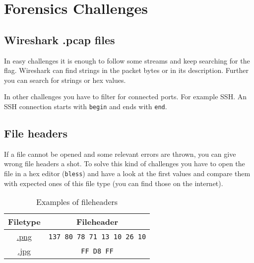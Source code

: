 
\section{Forensics Challenges}

\subsection{Wireshark .pcap files}
In easy challenges it is enough to follow some streams and keep searching for the flag. Wireshark can find strings in the packet bytes or in its description. Further you can search for strings or hex values.

In other challenges you have to filter for connected ports. For example SSH. An SSH connection starts with \texttt{begin} and ends with \texttt{end}.

\subsection{File headers}
If a file cannot be opened and some relevant errors are thrown, you can give wrong file headers a shot. To solve this kind of challenges you have to open the file in a hex editor (\texttt{bless}) and have a look at the first values and compare them with expected ones of this file type (you can find those on the internet).

\begin{table}[h!]
	\centering
	\begin{tabular}{c|c}
	\toprule
	\textbf{Filetype} & \textbf{Fileheader} \\
	\midrule
	\href{http://www.libpng.org/pub/png/spec/1.2/PNG-Structure.html}{.png} & \texttt{137 80 78 71 13 10 26 10} \\
	\midrule
	\href{https://www.file-recovery.com/jpg-signature-format.htm}{.jpg} & \texttt{FF D8 FF} \\
	\bottomrule
	\end{tabular}
	\caption{Examples of fileheaders}
\end{table}